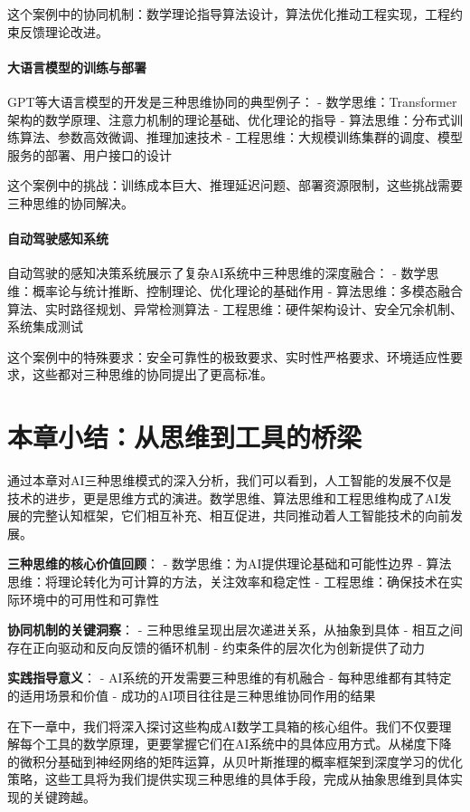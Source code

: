 这个案例中的协同机制：数学理论指导算法设计，算法优化推动工程实现，工程约束反馈理论改进。

\paragraph{大语言模型的训练与部署}
GPT等大语言模型的开发是三种思维协同的典型例子：
- 数学思维：Transformer架构的数学原理、注意力机制的理论基础、优化理论的指导
- 算法思维：分布式训练算法、参数高效微调、推理加速技术
- 工程思维：大规模训练集群的调度、模型服务的部署、用户接口的设计

这个案例中的挑战：训练成本巨大、推理延迟问题、部署资源限制，这些挑战需要三种思维的协同解决。

\paragraph{自动驾驶感知系统}
自动驾驶的感知决策系统展示了复杂AI系统中三种思维的深度融合：
- 数学思维：概率论与统计推断、控制理论、优化理论的基础作用
- 算法思维：多模态融合算法、实时路径规划、异常检测算法
- 工程思维：硬件架构设计、安全冗余机制、系统集成测试

这个案例中的特殊要求：安全可靠性的极致要求、实时性严格要求、环境适应性要求，这些都对三种思维的协同提出了更高标准。

\section{本章小结：从思维到工具的桥梁}

通过本章对AI三种思维模式的深入分析，我们可以看到，人工智能的发展不仅是技术的进步，更是思维方式的演进。数学思维、算法思维和工程思维构成了AI发展的完整认知框架，它们相互补充、相互促进，共同推动着人工智能技术的向前发展。

\textbf{三种思维的核心价值回顾}：
- 数学思维：为AI提供理论基础和可能性边界
- 算法思维：将理论转化为可计算的方法，关注效率和稳定性
- 工程思维：确保技术在实际环境中的可用性和可靠性

\textbf{协同机制的关键洞察}：
- 三种思维呈现出层次递进关系，从抽象到具体
- 相互之间存在正向驱动和反向反馈的循环机制
- 约束条件的层次化为创新提供了动力

\textbf{实践指导意义}：
- AI系统的开发需要三种思维的有机融合
- 每种思维都有其特定的适用场景和价值
- 成功的AI项目往往是三种思维协同作用的结果

在下一章中，我们将深入探讨这些构成AI数学工具箱的核心组件。我们不仅要理解每个工具的数学原理，更要掌握它们在AI系统中的具体应用方式。从梯度下降的微积分基础到神经网络的矩阵运算，从贝叶斯推理的概率框架到深度学习的优化策略，这些工具将为我们提供实现三种思维的具体手段，完成从抽象思维到具体实现的关键跨越。